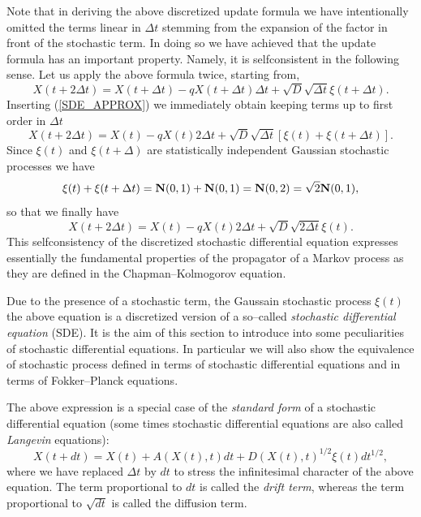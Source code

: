 Note that in deriving the above discretized update formula we have 
intentionally omitted the terms linear in $\Delta t$ stemming from 
the expansion of the factor in front of the stochastic term. In 
doing so we have achieved that the update formula has an important
property. Namely, it is selfconsistent in the following sense.
Let us apply the above formula twice, starting from,
\begin{equation*}
X(t+2\Delta t) = X(t+\Delta t) 
 - qX(t+ \Delta t) \Delta t + \sqrt{D} \sqrt{\Delta t} \xi(t+\Delta t).
\end{equation*}
Inserting (\ref{SDE_APPROX}) we immediately obtain keeping 
terms up to first order in $\Delta t$
\begin{equation*}
X(t+2 \Delta t) = X(t) - q X(t) 2 \Delta t +
   \sqrt{D} \sqrt{\Delta t} [\xi(t) + \xi(t+\Delta t)].
\end{equation*}
Since $\xi(t)$ and $\xi(t+\Delta)$ are statistically independent
Gaussian stochastic processes we have
\begin{equation*}
\xi(t) + \xi(t+\Delta t) = {\bf N}(0,1) + {\bf N}(0,1) =
  {\bf N}(0,2) = \sqrt{2} {\bf N}(0,1),
\end{equation*}
so that we finally have
\begin{equation*}
X(t+2 \Delta t) = X(t) - q X(t) 2 \Delta t +
   \sqrt{D} \sqrt{2 \Delta t} \xi(t).
\end{equation*}
This selfconsistency of the discretized stochastic differential 
equation expresses essentially the fundamental properties
of the propagator of a Markov process as they are defined in
the Chapman--Kolmogorov equation.


Due to the presence of a stochastic term, the Gaussain stochastic
process $\xi(t)$ the above equation is a discretized version of a 
so--called {\em stochastic differential equation} (SDE). It is the aim
of this section to introduce into some  peculiarities of stochastic
differential equations. In particular we will also show the
equivalence of stochastic process defined in terms of stochastic differential
equations and in terms of Fokker--Planck equations.

The above expression is a special case of the  {\em standard form} of
a stochastic differential equation (some times stochastic
differential equations are also called {\em Langevin} equations):
\begin{equation}
\label{SDE_LANGEVIN_DISCR}
X(t+dt) = X(t) + A(X(t),t)dt + D(X(t),t)^{1/2} \xi(t) dt^{1/2},
\end{equation}
where we have replaced $\Delta t$  by $dt$ to stress the infinitesimal
character of the above equation. The term proportional to $dt$ is
called the {\em drift term}, whereas the term proportional to
$\sqrt{dt}$ is called the diffusion term. 

